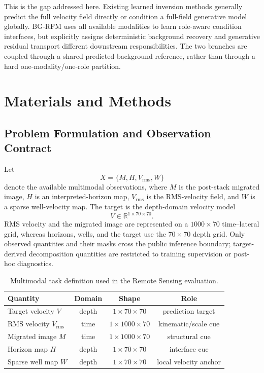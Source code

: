 \documentclass[remotesensing,article,submit,pdftex,moreauthors]{Definitions/mdpi}
\newcommand{\method}{BG-RFM}
\begin{document}
This is the gap addressed here. Existing learned inversion methods generally predict the full velocity field directly or condition a full-field generative model globally. \method{} uses all available modalities to learn role-aware condition interfaces, but explicitly assigns deterministic background recovery and generative residual transport different downstream responsibilities. The two branches are coupled through a shared predicted-background reference, rather than through a hard one-modality/one-role partition.

\section{Materials and Methods}

\subsection{Problem Formulation and Observation Contract}

Let
\[
X=\{M,H,V_{\mathrm{rms}},W\}
\]
denote the available multimodal observations, where $M$ is the post-stack migrated image, $H$ is an interpreted-horizon map, $V_{\mathrm{rms}}$ is the RMS-velocity field, and $W$ is a sparse well-velocity map. The target is the depth-domain velocity model
\[
V\in\mathbb{R}^{1\times70\times70}.
\]
RMS velocity and the migrated image are represented on a $1000\times70$ time--lateral grid, whereas horizons, wells, and the target use the $70\times70$ depth grid. Only observed quantities and their masks cross the public inference boundary; target-derived decomposition quantities are restricted to training supervision or post-hoc diagnostics.


\begin{table}[H]
\caption{Multimodal task definition used in the Remote Sensing evaluation.\label{tab:task-contract}}
\begin{tabularx}{\textwidth}{lCCC}
\toprule
\textbf{Quantity} & \textbf{Domain} & \textbf{Shape} & \textbf{Role} \\
\midrule
Target velocity $V$ & depth & $1\times70\times70$ & prediction target \\
RMS velocity $V_{\mathrm{rms}}$ & time & $1\times1000\times70$ & kinematic/scale cue \\
Migrated image $M$ & time & $1\times1000\times70$ & structural cue \\
Horizon map $H$ & depth & $1\times70\times70$ & interface cue \\
Sparse well map $W$ & depth & $1\times70\times70$ & local velocity anchor \\
\bottomrule
\end{tabularx}
\end{table}
\end{document}
